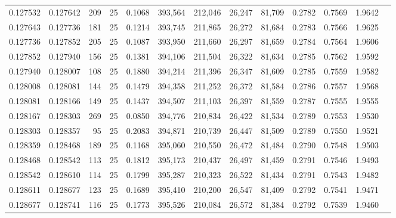 \begin{tabular}{rrrrrrrrrrrrr}
0.127532 & 0.127642 &   209 &  25 &                                     0.1068 & 393,564 & 212,046 &  26,247 &  81,709 & 0.2782 & 0.7569 & 1.9642 \\
0.127643 & 0.127736 &   181 &  25 &                                     0.1214 & 393,745 & 211,865 &  26,272 &  81,684 & 0.2783 & 0.7566 & 1.9625 \\
0.127736 & 0.127852 &   205 &  25 &                                     0.1087 & 393,950 & 211,660 &  26,297 &  81,659 & 0.2784 & 0.7564 & 1.9606 \\
0.127852 & 0.127940 &   156 &  25 &                                     0.1381 & 394,106 & 211,504 &  26,322 &  81,634 & 0.2785 & 0.7562 & 1.9592 \\
0.127940 & 0.128007 &   108 &  25 &                                     0.1880 & 394,214 & 211,396 &  26,347 &  81,609 & 0.2785 & 0.7559 & 1.9582 \\
0.128008 & 0.128081 &   144 &  25 &                                     0.1479 & 394,358 & 211,252 &  26,372 &  81,584 & 0.2786 & 0.7557 & 1.9568 \\
0.128081 & 0.128166 &   149 &  25 &                                     0.1437 & 394,507 & 211,103 &  26,397 &  81,559 & 0.2787 & 0.7555 & 1.9555 \\
0.128167 & 0.128303 &   269 &  25 &                                     0.0850 & 394,776 & 210,834 &  26,422 &  81,534 & 0.2789 & 0.7553 & 1.9530 \\
0.128303 & 0.128357 &    95 &  25 &                                     0.2083 & 394,871 & 210,739 &  26,447 &  81,509 & 0.2789 & 0.7550 & 1.9521 \\
0.128359 & 0.128468 &   189 &  25 &                                     0.1168 & 395,060 & 210,550 &  26,472 &  81,484 & 0.2790 & 0.7548 & 1.9503 \\
0.128468 & 0.128542 &   113 &  25 &                                     0.1812 & 395,173 & 210,437 &  26,497 &  81,459 & 0.2791 & 0.7546 & 1.9493 \\
0.128542 & 0.128610 &   114 &  25 &                                     0.1799 & 395,287 & 210,323 &  26,522 &  81,434 & 0.2791 & 0.7543 & 1.9482 \\
0.128611 & 0.128677 &   123 &  25 &                                     0.1689 & 395,410 & 210,200 &  26,547 &  81,409 & 0.2792 & 0.7541 & 1.9471 \\
0.128677 & 0.128741 &   116 &  25 &                                     0.1773 & 395,526 & 210,084 &  26,572 &  81,384 & 0.2792 & 0.7539 & 1.9460 \\

\end{tabular}
